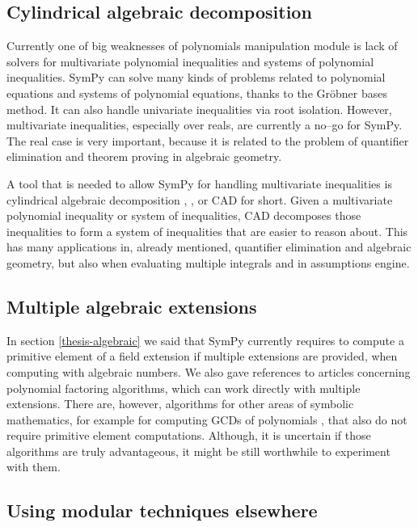 \subsection{Cylindrical algebraic decomposition}

Currently one of big weaknesses of polynomials manipulation module is lack of solvers for multivariate
polynomial inequalities and systems of polynomial inequalities. SymPy can solve many kinds of problems
related to polynomial equations and systems of polynomial equations, thanks to the Gröbner bases
method. It can also handle univariate inequalities via root isolation. However, multivariate inequalities,
especially over reals, are currently a no--go for SymPy. The real case is very important, because it is
related to the problem of quantifier elimination and theorem proving in algebraic geometry.

A tool that is needed to allow SymPy for handling multivariate inequalities is cylindrical algebraic
decomposition \cite{Arnon1984basic}, \cite{Jirstrand1995cylindrical}, or CAD for short. Given a multivariate
polynomial inequality or system of inequalities, CAD decomposes those inequalities to form a system
of inequalities that are easier to reason about. This has many applications in, already mentioned,
quantifier elimination and algebraic geometry, but also when evaluating multiple integrals and in
assumptions engine.


\subsection{Multiple algebraic extensions}

In section \ref{thesis-algebraic} we said that SymPy currently requires to compute a primitive
element of a field extension if multiple extensions are provided, when computing with algebraic
numbers. We also gave references to articles concerning polynomial factoring algorithms, which
can work directly with multiple extensions. There are, however, algorithms for other areas of
symbolic mathematics, for example for computing GCDs of polynomials \cite{vanHoeij2002modgcd}, that
also do not require primitive element computations. Although, it is uncertain if those algorithms
are truly advantageous, it might be still worthwhile to experiment with them.


\subsection{Using modular techniques elsewhere}

